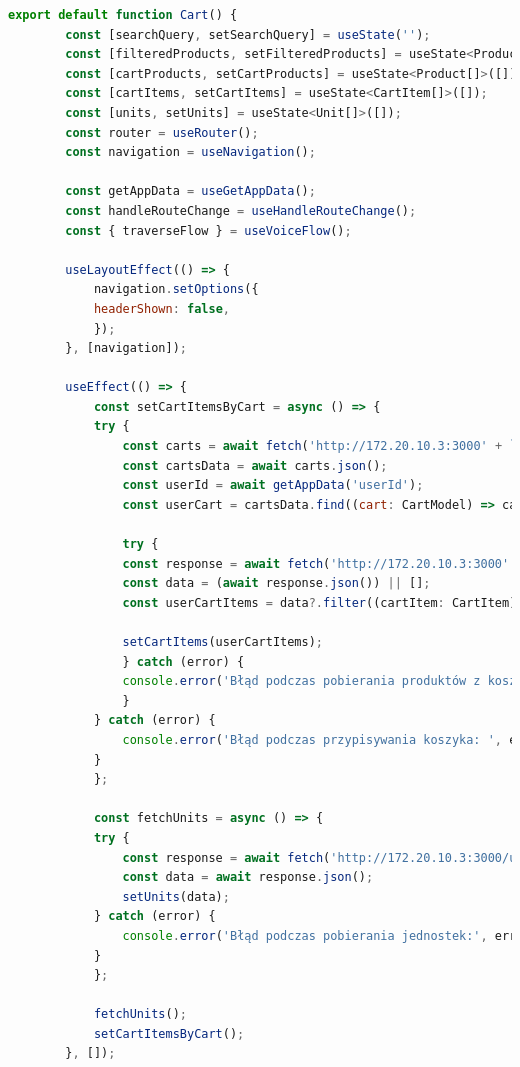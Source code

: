 \begin{lstlisting}[language=JavaScript, caption=Koszyk użytkownika implementacja, label=lst:service]
    export default function Cart() {
        const [searchQuery, setSearchQuery] = useState('');
        const [filteredProducts, setFilteredProducts] = useState<Product[]>([]);
        const [cartProducts, setCartProducts] = useState<Product[]>([]);
        const [cartItems, setCartItems] = useState<CartItem[]>([]);
        const [units, setUnits] = useState<Unit[]>([]);
        const router = useRouter();
        const navigation = useNavigation();

        const getAppData = useGetAppData();
        const handleRouteChange = useHandleRouteChange();
        const { traverseFlow } = useVoiceFlow();

        useLayoutEffect(() => {
            navigation.setOptions({
            headerShown: false,
            });
        }, [navigation]);

        useEffect(() => {
            const setCartItemsByCart = async () => {
            try {
                const carts = await fetch('http://172.20.10.3:3000' + `/carts`);
                const cartsData = await carts.json();
                const userId = await getAppData('userId');
                const userCart = cartsData.find((cart: CartModel) => cart.user_id === userId);

                try {
                const response = await fetch('http://172.20.10.3:3000' + `/cart-items`);
                const data = (await response.json()) || [];
                const userCartItems = data?.filter((cartItem: CartItem) => cartItem?.cart_id === userCart?.cart_id);

                setCartItems(userCartItems);
                } catch (error) {
                console.error('Błąd podczas pobierania produktów z koszyka:', error);
                }
            } catch (error) {
                console.error('Błąd podczas przypisywania koszyka: ', error);
            }
            };

            const fetchUnits = async () => {
            try {
                const response = await fetch('http://172.20.10.3:3000/units');
                const data = await response.json();
                setUnits(data);
            } catch (error) {
                console.error('Błąd podczas pobierania jednostek:', error);
            }
            };

            fetchUnits();
            setCartItemsByCart();
        }, []);


\end{lstlisting}
